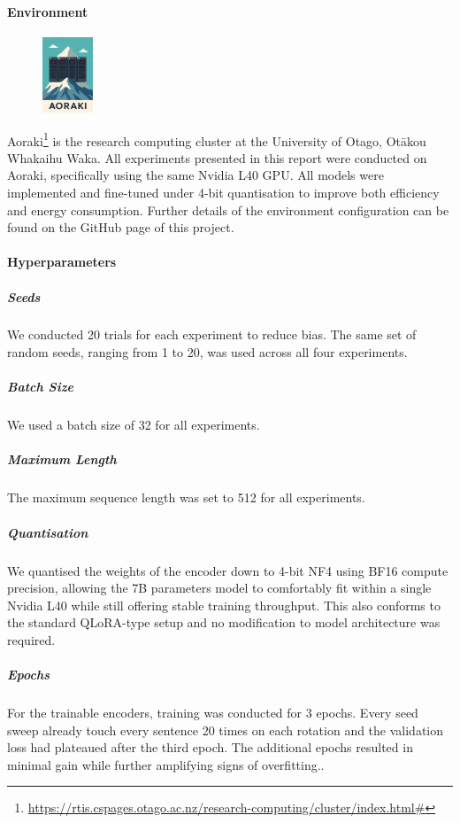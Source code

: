 \documentclass[12pt]{article}
\begin{document}
\paragraph{Environment}
\begin{figure}
  \vspace{-60pt}
  \begin{minipage}{1\linewidth}
    \centering
    \includegraphics[width=1.5cm]{figures/aoraki.png}
  \end{minipage}%
\end{figure}
Aoraki\footnote{\url{https://rtis.cspages.otago.ac.nz/research-computing/cluster/index.html\#}} 
is the research computing cluster at the University of Otago, Otākou Whakaihu Waka. 
All experiments presented in this report were conducted on Aoraki, specifically using the same Nvidia L40 GPU. 
All models were implemented and fine-tuned under 4-bit quantisation to improve both efficiency and energy consumption. 
Further details of the environment configuration can be found on the GitHub page of this project.

\paragraph{Hyperparameters}

\subparagraph{Seeds}
We conducted 20 trials for each experiment to reduce bias. 
The same set of random seeds, ranging from 1 to 20, was used across all four experiments.

\subparagraph{Batch Size}
We used a batch size of 32 for all experiments.

\subparagraph{Maximum Length}
The maximum sequence length was set to 512 for all experiments.

\subparagraph{Quantisation}
We quantised the weights of the encoder down to 4-bit NF4 using BF16 compute precision, allowing the 7B parameters model to comfortably fit within a single Nvidia L40 while still offering stable training throughput. This also conforms to the standard QLoRA-type setup and no modification to model architecture was required.

\subparagraph{Epochs}
For the trainable encoders, training was conducted for 3 epochs. Every seed sweep already touch every sentence 20 times on each rotation and the validation loss had plateaued after the third epoch. The additional epochs resulted in minimal gain while further amplifying signs of overfitting..
\end{document}
